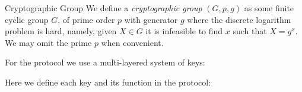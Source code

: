 \begin{definitiontoc}{Cryptographic Group}
    We define a \emph{cryptographic group} $(G, p, g)$ as some finite cyclic group $G$, of prime order $p$ with generator $g$ where the discrete logarithm problem is hard, namely, given $X \in G$ it is infeasible to find $x$ such that $X = g^x$. We may omit the prime $p$ when convenient.
\end{definitiontoc}


For the \Transfer{} protocol we use a multi-layered system of keys:

\begin{center}
    \vspace{1em}
    \begin{mdframed}[leftmargin=0.125\textwidth, rightmargin=0.125\textwidth]
        \begin{center}
        \end{center}
    \end{mdframed}
    \vspace{-1em}
\end{center}

Here we define each key and its function in the \Transfer{} protocol:

